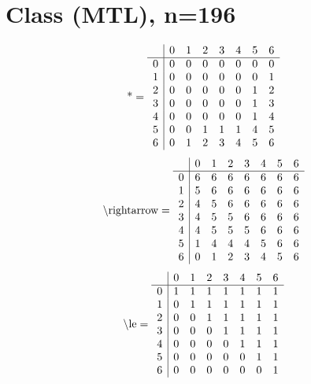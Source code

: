 \documentclass[11pt]{article}
\begin{document}
\section{Class (MTL), n=196}
\[\text{*} = 
\begin{array}{r | r r r r r r r}
 & 0 & 1 & 2 & 3 & 4 & 5 & 6 \\ \hline
0 & 0 & 0 & 0 & 0 & 0 & 0 & 0 \\
1 & 0 & 0 & 0 & 0 & 0 & 0 & 1 \\
2 & 0 & 0 & 0 & 0 & 0 & 1 & 2 \\
3 & 0 & 0 & 0 & 0 & 0 & 1 & 3 \\
4 & 0 & 0 & 0 & 0 & 0 & 1 & 4 \\
5 & 0 & 0 & 1 & 1 & 1 & 4 & 5 \\
6 & 0 & 1 & 2 & 3 & 4 & 5 & 6 \\
\end{array}
\]
\[\text{\textbackslash rightarrow} = 
\begin{array}{r | r r r r r r r}
 & 0 & 1 & 2 & 3 & 4 & 5 & 6 \\ \hline
0 & 6 & 6 & 6 & 6 & 6 & 6 & 6 \\
1 & 5 & 6 & 6 & 6 & 6 & 6 & 6 \\
2 & 4 & 5 & 6 & 6 & 6 & 6 & 6 \\
3 & 4 & 5 & 5 & 6 & 6 & 6 & 6 \\
4 & 4 & 5 & 5 & 5 & 6 & 6 & 6 \\
5 & 1 & 4 & 4 & 4 & 5 & 6 & 6 \\
6 & 0 & 1 & 2 & 3 & 4 & 5 & 6 \\
\end{array}
\]
\[\text{\textbackslash le} = 
\begin{array}{r | r r r r r r r}
 & 0 & 1 & 2 & 3 & 4 & 5 & 6 \\ \hline
0 & 1 & 1 & 1 & 1 & 1 & 1 & 1 \\
1 & 0 & 1 & 1 & 1 & 1 & 1 & 1 \\
2 & 0 & 0 & 1 & 1 & 1 & 1 & 1 \\
3 & 0 & 0 & 0 & 1 & 1 & 1 & 1 \\
4 & 0 & 0 & 0 & 0 & 1 & 1 & 1 \\
5 & 0 & 0 & 0 & 0 & 0 & 1 & 1 \\
6 & 0 & 0 & 0 & 0 & 0 & 0 & 1 \\
\end{array}
\]
\end{document}
